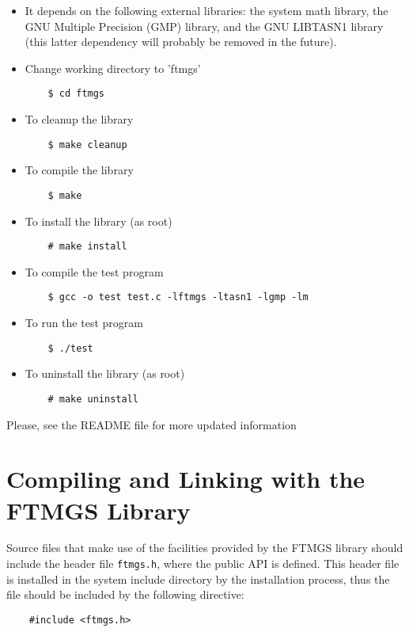 \documentclass[a4paper]{article}
\begin{document}
\begin{itemize}%
\item It depends on the following external libraries: the system math
  library, the GNU Multiple Precision (GMP) library, and the GNU
  LIBTASN1 library (this latter dependency will probably be removed in
  the future).
\item Change working directory to 'ftmgs'
\begin{verbatim}
    $ cd ftmgs
\end{verbatim}
\item To cleanup the library
\begin{verbatim}
    $ make cleanup
\end{verbatim}
\item To compile the library
\begin{verbatim}
    $ make
\end{verbatim}
\item To install the library (as root)
\begin{verbatim}
    # make install
\end{verbatim}
\item To compile the test program
\begin{verbatim}
    $ gcc -o test test.c -lftmgs -ltasn1 -lgmp -lm
\end{verbatim}
\item To run the test program
\begin{verbatim}
	$ ./test
\end{verbatim}
\item To uninstall the library (as root)
\begin{verbatim}
    # make uninstall
\end{verbatim}
\end{itemize}%

Please, see the README file for more updated information

\section{Compiling and Linking with the FTMGS Library}

Source files that make use of the facilities provided by the FTMGS
library should include the header file \verb|ftmgs.h|, where the
public API is defined. This header file is installed in the system
include directory by the installation process, thus the file should be
included by the following directive:
\begin{verbatim}
    #include <ftmgs.h>
\end{verbatim}
\end{document}
